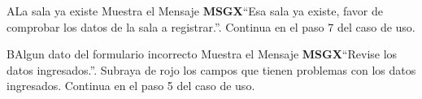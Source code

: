 		\begin{UCtrayectoriaA}{A}{La sala ya existe}
			\UCpaso Muestra el Mensaje {\bf MSGX}``Esa sala ya existe, favor de comprobar los datos de la sala a registrar.''.
			\UCpaso Continua en el paso 7 del caso de uso.
		\end{UCtrayectoriaA}
		
		\begin{UCtrayectoriaA}{B}{Algun dato del formulario incorrecto}
			\UCpaso Muestra el Mensaje {\bf MSGX}``Revise los datos ingresados.''.
                \UCpaso Subraya de rojo los campos que tienen problemas con los datos ingresados.
			\UCpaso Continua en el paso 5 del caso de uso.
		\end{UCtrayectoriaA}

